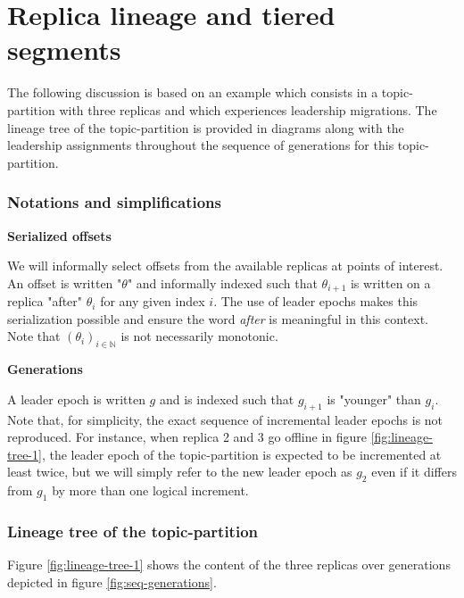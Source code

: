 \documentclass{article}
\begin{document}
\section{Replica lineage and tiered segments}

The following discussion is based on an example which consists in a topic-partition with three replicas and which experiences leadership migrations. The lineage tree of the topic-partition is provided in diagrams along with the leadership assignments throughout the sequence of generations for this topic-partition.

\subsubsection{Notations and simplifications}

\textbf{Serialized offsets}

We will informally select offsets from the available replicas at points of interest. An offset is written "$\theta$" and informally indexed such that $\theta_{i+1}$ is written on a replica "after" $\theta_i$ for any given index $i$. The use of leader epochs makes this serialization possible and ensure the word \textit{after} is meaningful in this context. Note that $(\theta_i)_{i \in \mathbb{N}}$ is not necessarily monotonic. 

\textbf{Generations}

A leader epoch is written $g$ and is indexed such that $g_{i+1}$ is "younger" than $g_i$. Note that, for simplicity, the exact sequence of incremental leader epochs is not reproduced. For instance, when replica 2 and 3 go offline in figure \ref{fig:lineage-tree-1}, the leader epoch of the topic-partition is expected to be incremented at least twice, but we will simply refer to the new leader epoch as $g_2$ even if it differs from $g_1$ by more than one logical increment.

\subsubsection{Lineage tree of the topic-partition}

Figure \ref{fig:lineage-tree-1} shows the content of the three replicas over generations depicted in figure \ref{fig:seq-generations}.
\end{document}
